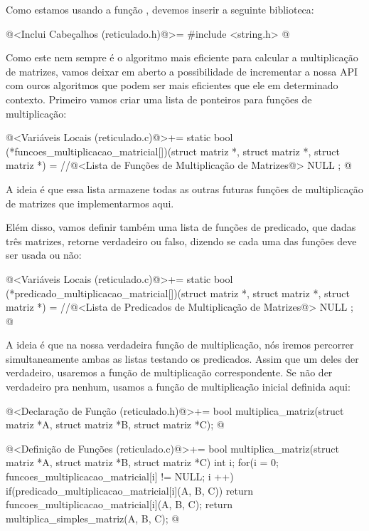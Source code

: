 Como estamos usando a função , devemos inserir a
seguinte biblioteca:

\iniciocodigo
@<Inclui Cabeçalhos (reticulado.h)@>=
#include <string.h>
@
\fimcodigo

Como este nem sempre é o algoritmo mais eficiente para calcular a
multiplicação de matrizes, vamos deixar em aberto a possibilidade de
incrementar a nossa API com ouros algoritmos que podem ser mais
eficientes que ele em determinado contexto. Primeiro vamos criar uma
lista de ponteiros para funções de multiplicação:

\iniciocodigo
@<Variáveis Locais (reticulado.c)@>+=
static bool (*funcoes_multiplicacao_matricial[])(struct matriz *,
                                                struct matriz *,
                                                struct matriz *) =
  {
    //@<Lista de Funções de Multiplicação de Matrizes@>
    NULL
  };
@
\fimcodigo

A ideia é que essa lista armazene todas as outras futuras funções de
multiplicação de matrizes que implementarmos aqui.

Elém disso, vamos definir também uma lista de funções de predicado,
que dadas três matrizes, retorne verdadeiro ou falso, dizendo se cada
uma das funções deve ser usada ou não:

\iniciocodigo
@<Variáveis Locais (reticulado.c)@>+=
static bool (*predicado_multiplicacao_matricial[])(struct matriz *,
                                                  struct matriz *,
                                                  struct matriz *) =
  {
    //@<Lista de Predicados de Multiplicação de Matrizes@>
    NULL
  };
@
\fimcodigo

A ideia é que na nossa verdadeira função de multiplicação, nós iremos
percorrer simultaneamente ambas as listas testando os
predicados. Assim que um deles der verdadeiro, usaremos a função de
multiplicação correspondente. Se não der verdadeiro pra nenhum, usamos
a função de multiplicação inicial definida aqui:

\iniciocodigo
@<Declaração de Função (reticulado.h)@>+=
bool multiplica_matriz(struct matriz *A, struct matriz *B,
                        struct matriz *C);
@
\fimcodigo

\iniciocodigo
@<Definição de Funções (reticulado.c)@>+=
bool multiplica_matriz(struct matriz *A, struct matriz *B,
                       struct matriz *C){
  int i;
  for(i = 0; funcoes_multiplicacao_matricial[i] != NULL; i ++)
    if(predicado_multiplicacao_matricial[i](A, B, C))
      return funcoes_multiplicacao_matricial[i](A, B, C);
  return multiplica_simples_matriz(A, B, C);
}
@
\fimcodigo

